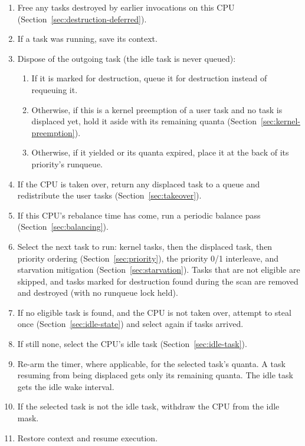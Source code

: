\documentclass[11pt]{article}
\begin{document}
\begin{enumerate}
	\item Free any tasks destroyed by earlier invocations on this CPU (Section~\ref{sec:destruction-deferred}).
	\item If a task was running, save its context.
	\item Dispose of the outgoing task (the idle task is never queued):
	      \begin{enumerate}
		      \item If it is marked for destruction, queue it for destruction instead of requeuing it.
		      \item Otherwise, if this is a kernel preemption of a user task and no task is displaced yet, hold it aside with its remaining quanta (Section~\ref{sec:kernel-preemption}).
		      \item Otherwise, if it yielded or its quanta expired, place it at the back of its priority's runqueue.
	      \end{enumerate}
	\item If the CPU is taken over, return any displaced task to a queue and redistribute the user tasks (Section~\ref{sec:takeover}).
	\item If this CPU's rebalance time has come, run a periodic balance pass (Section~\ref{sec:balancing}).
	\item Select the next task to run: kernel tasks, then the displaced task, then priority ordering (Section~\ref{sec:priority}), the priority 0/1 interleave, and starvation mitigation (Section~\ref{sec:starvation}). Tasks that are not eligible are skipped, and tasks marked for destruction found during the scan are removed and destroyed (with no runqueue lock held).
	\item If no eligible task is found, and the CPU is not taken over, attempt to steal once (Section~\ref{sec:idle-state}) and select again if tasks arrived.
	\item If still none, select the CPU's idle task (Section~\ref{sec:idle-task}).
	\item Re-arm the timer, where applicable, for the selected task's quanta. A task resuming from being displaced gets only its remaining quanta. The idle task gets the idle wake interval.
	\item If the selected task is not the idle task, withdraw the CPU from the idle mask.
	\item Restore context and resume execution.
\end{enumerate}
\end{document}
